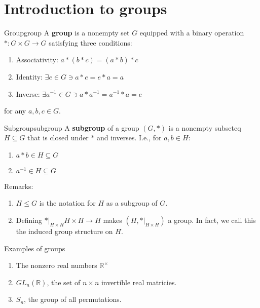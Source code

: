 \documentclass{article}
\begin{document}

\section{Introduction to groups}

\begin{cdef}{Group}{group}
    A \textbf{group} is a nonempty set $G$ equipped with a binary operation $*: G \times G \to G$ satisfying three conditions:
    \begin{enumerate}
        \item Associativity: $a*(b*c) = (a*b)*c$
        \item Identity: $\exists e \in G \ni a*e = e*a = a$
        \item Inverse: $\exists a^{-1} \in G \ni a*a^{-1} = a^{-1}*a = e$
    \end{enumerate}
    for any $a,b,c \in G$.
\end{cdef}

\begin{cdef}{Subgroup}{subgroup}
    A \textbf{subgroup} of a group $(G,*)$ is a nonempty subseteq $H \subseteq G$ that is closed under $*$ and inverses. I.e., for $a,b \in H$:
    \begin{enumerate}
        \item $a*b \in H \subseteq G$
        \item $a^{-1}\in H \subseteq G$
    \end{enumerate}
\end{cdef}

Remarks:
\begin{enumerate}
    \item $H \leq G$ is the notation for $H$ as a subgroup of $G$.
    \item Defining $*|_{H \times H} H \times H \to H$ makes $(H, *|_{H \times H})$ a group. In fact, we call this the induced group structure on $H$.
\end{enumerate}

\begin{cex}{Examples of groups}{}
    \begin{enumerate}
        \item The nonzero real numbers $\mathbb{R}^{\times}$
        \item $GL_{n}(\mathbb{R})$, the set of $n\times n$ invertible real matricies. 
        \item $S_n$, the group of all permutations.
    \end{enumerate}
\end{cex}
\end{document}
